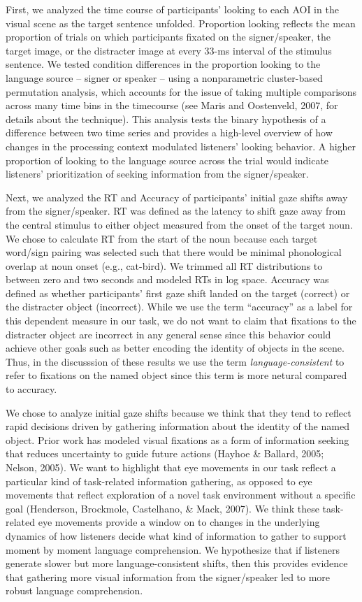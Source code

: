 \documentclass[,man,floatsintext]{apa6}
\begin{document}
First, we analyzed the time course of participants' looking to each AOI in the visual scene as the target sentence unfolded. Proportion looking reflects the mean proportion of trials on which participants fixated on the signer/speaker, the target image, or the distracter image at every 33-ms interval of the stimulus sentence. We tested condition differences in the proportion looking to the language source -- signer or speaker -- using a nonparametric cluster-based permutation analysis, which accounts for the issue of taking multiple comparisons across many time bins in the timecourse (see Maris and Oostenveld, 2007, for details about the technique). This analysis tests the binary hypothesis of a difference between two time series and provides a high-level overview of how changes in the processing context modulated listeners' looking behavior. A higher proportion of looking to the language source across the trial would indicate listeners' prioritization of seeking information from the signer/speaker.

Next, we analyzed the RT and Accuracy of participants' initial gaze shifts away from the signer/speaker. RT was defined as the latency to shift gaze away from the central stimulus to either object measured from the onset of the target noun. We chose to calculate RT from the start of the noun because each target word/sign pairing was selected such that there would be minimal phonological overlap at noun onset (e.g., cat-bird). We trimmed all RT distributions to between zero and two seconds and modeled RTs in log space. Accuracy was defined as whether participants' first gaze shift landed on the target (correct) or the distracter object (incorrect). While we use the term \enquote{accuracy} as a label for this dependent measure in our task, we do not want to claim that fixations to the distracter object are incorrect in any general sense since this behavior could achieve other goals such as better encoding the identity of objects in the scene. Thus, in the discusssion of these results we use the term \emph{language-consistent} to refer to fixations on the named object since this term is more netural compared to accuracy.

We chose to analyze initial gaze shifts because we think that they tend to reflect rapid decisions driven by gathering information about the identity of the named object. Prior work has modeled visual fixations as a form of information seeking that reduces uncertainty to guide future actions (Hayhoe \& Ballard, 2005; Nelson, 2005). We want to highlight that eye movements in our task reflect a particular kind of task-related information gathering, as opposed to eye movements that reflect exploration of a novel task environment without a specific goal (Henderson, Brockmole, Castelhano, \& Mack, 2007). We think these task-related eye movements provide a window on to changes in the underlying dynamics of how listeners decide what kind of information to gather to support moment by moment language comprehension. We hypothesize that if listeners generate slower but more language-consistent shifts, then this provides evidence that gathering more visual information from the signer/speaker led to more robust language comprehension.
\end{document}
